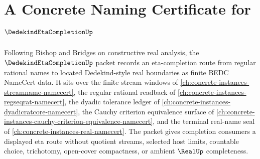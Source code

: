 \chapter{A Concrete Naming Certificate for $\DedekindEtaCompletionUp$}
\label{ch:concrete-instances-dedekind-eta-completion-namecert}

Following Bishop and Bridges on constructive real analysis, the $\DedekindEtaCompletionUp$ packet records an eta-completion route from regular rational names to located Dedekind-style real boundaries as finite BEDC NameCert data. It sits over the finite stream windows of \autoref{ch:concrete-instances-streamname-namecert}, the regular rational readback of \autoref{ch:concrete-instances-regseqrat-namecert}, the dyadic tolerance ledger of \autoref{ch:concrete-instances-dyadicratcore-namecert}, the Cauchy criterion equivalence surface of \autoref{ch:concrete-instances-cauchy-criterion-equivalence-namecert}, and the terminal real-name seal of \autoref{ch:concrete-instances-real-namecert}. The packet gives completion consumers a displayed eta route without quotient streams, selected host limits, countable choice, trichotomy, open-cover compactness, or ambient $\RealUp$ completeness.

